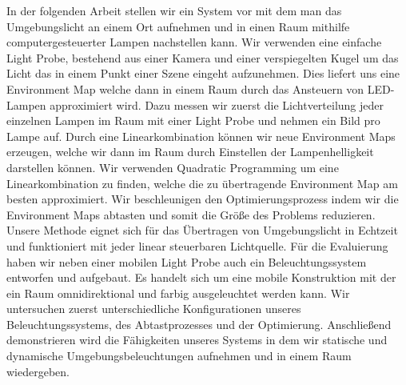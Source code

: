 In der folgenden Arbeit stellen wir ein System vor mit dem man das Umgebungslicht an einem Ort aufnehmen und in einen Raum mithilfe computergesteuerter Lampen nachstellen kann. 
Wir verwenden eine einfache Light Probe, bestehend aus einer Kamera und einer verspiegelten Kugel um das Licht das in einem Punkt einer Szene eingeht aufzunehmen.
Dies liefert uns eine Environment Map welche dann in einem Raum durch das Ansteuern von LED-Lampen approximiert wird.
Dazu messen wir zuerst die Lichtverteilung jeder einzelnen Lampen im Raum mit einer Light Probe und nehmen ein Bild pro Lampe auf.
Durch eine Linearkombination können wir neue Environment Maps erzeugen, welche wir dann im Raum durch Einstellen der Lampenhelligkeit darstellen können.
Wir verwenden Quadratic Programming um eine Linearkombination zu finden, welche die zu übertragende Environment Map am besten approximiert.
Wir beschleunigen den Optimierungsprozess indem wir die Environment Maps abtasten und somit die Größe des Problems reduzieren.
Unsere Methode eignet sich für das Übertragen von Umgebungslicht in Echtzeit und funktioniert mit jeder linear steuerbaren Lichtquelle.
Für die Evaluierung haben wir neben einer mobilen Light Probe auch ein Beleuchtungssystem entworfen und aufgebaut. 
Es handelt sich um eine mobile Konstruktion mit der ein Raum omnidirektional und farbig ausgeleuchtet werden kann.
Wir untersuchen zuerst unterschiedliche Konfigurationen unseres Beleuchtungssystems, des Abtastprozesses und der Optimierung.
Anschließend demonstrieren wird die Fähigkeiten unseres Systems in dem wir statische und dynamische Umgebungsbeleuchtungen aufnehmen und in einem Raum wiedergeben.

 

